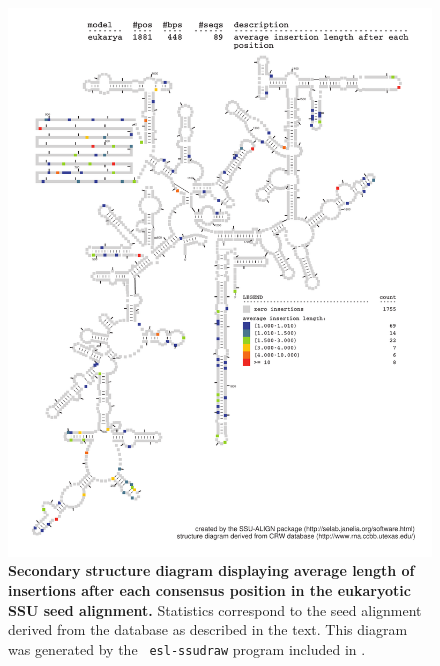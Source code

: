 \begin{figure}
\begin{center}
\includegraphics[width=5.7in]{Figures/eukarya-0p1-iavglen}
\end{center}
\caption[Secondary structure diagram displaying average length of insertions
  after each consensus position in the eukaryotic SSU seed
  alignment]{\textbf{Secondary structure diagram displaying average
    length of insertions after each consensus position in the eukaryotic SSU seed
  alignment.} Statistics correspond to the  seed
  alignment derived from the  database \cite{CannoneGutell02}
  as described in the text. This diagram was generated by the {\tt
  esl-ssudraw} program included in .}
\label{fig:baciavglen}
\end{figure}

